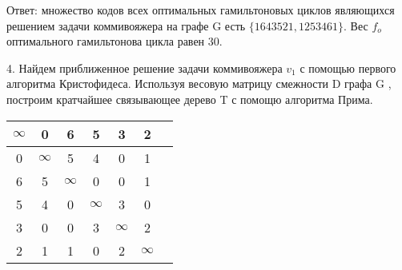 \documentclass[a4paper,10pt]{report} %
\begin{document}
\bigskip

{\large
Ответ: множество кодов всех оптимальных гамильтоновых циклов являющихся решением задачи коммивояжера на графе G есть $\{1643521, 1253461 \}$. Вес $f_o$ оптимального гамильтонова цикла равен 30.
}

\newpage


4. \quad Найдем приближенное решение задачи коммивояжера $v_1$ с помощью первого алгоритма Кристофидеса. Используя весовую матрицу смежности D графа G , построим кратчайшее связывающее дерево T с помощю алгоритма Прима.

\begin{flushleft}
\begin{tabular}[]{|c|c|c|c|c|c|c|}
\hline
$\infty$ &      0 &      6 &      5 &      3 &      2\\
\hline
	  0 & $\infty$ &      5 &      4 &      0 &      1\\
\hline
      6 &      5 & $\infty$ &      0 &      0 &      1\\
\hline
      5 &      4 &      0 & $\infty$ &      3 &      0\\
\hline
      3 &      0 &      0 &      3 & $\infty$ &      2\\
\hline
      2 &      1 &      1 &      0 &      2 & $\infty$\\
\hline
\end{tabular}
\end{flushleft}
\end{document}

